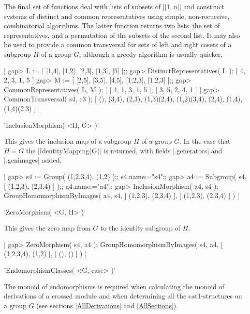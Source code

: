 The final set of functions deal with lists of  subsets of |[1..n]| and
construct systems of distinct and common representatives using simple,
non-recursive, combinatorial algorithms.   The latter function returns
two lists\:\  the  set of representatives,   and a permutation of  the
subsets of the second list.   It may also be used  to provide a common
transversal for sets of left and right  cosets of a  subgroup $H$ of a
group $G$, although a greedy algorithm is usually quicker.

|    gap> L := [ [1,4], [1,2], [2,3], [1,3], [5] ];;
    gap> DistinctRepresentatives( L );
    [ 4, 2, 3, 1, 5 ]
    gap> M := [ [2,5], [3,5], [4,5], [1,2,3], [1,2,3] ];;
    gap> CommonRepresentatives( L, M );
    [ [ 4, 1, 3, 1, 5 ], [ 3, 5, 2, 4, 1 ] ]
    gap> CommonTransversal( s4, c3 );
    [ (), (3,4), (2,3), (1,3)(2,4), (1,2)(3,4), (2,4), (1,4), (1,4)(2,3) ] |

%

'InclusionMorphism( <H, G> )'

This gives the inclusion map of a subgroup $H$ of a group $G$.  In the
case  that $H=G$ the   |IdentityMapping(G)|  is returned, with  fields
|.generators| and |.genimages| added.

|    gap> s4 := Group( (1,2,3,4), (1,2) );; s4.name:="s4";;
    gap> a4 := Subgroup( s4, [ (1,2,3), (2,3,4) ] );; a4.name:="a4";;
    gap> InclusionMorphism( a4, s4 );
    GroupHomomorphismByImages( a4, s4, [ (1,2,3), (2,3,4) ],
      [ (1,2,3), (2,3,4) ] ) |

%

'ZeroMorphism( <G, H> )'

This gives the zero map from  $G$  to the identity subgroup of  $H$.

|    gap> ZeroMorphism( s4, a4 );
    GroupHomomorphismByImages( s4, a4, [ (1,2,3,4), (1,2) ], [ (), () ] ) |

%

'EndomorphismClasses( <G, case> )'

The monoid of endomorphisms is required when calculating the monoid of
derivations of    a   crossed module and  when    determining  all the
cat1-structures on a group $G$  (see sections \ref{AllDerivations} and
\ref{AllSections}).

